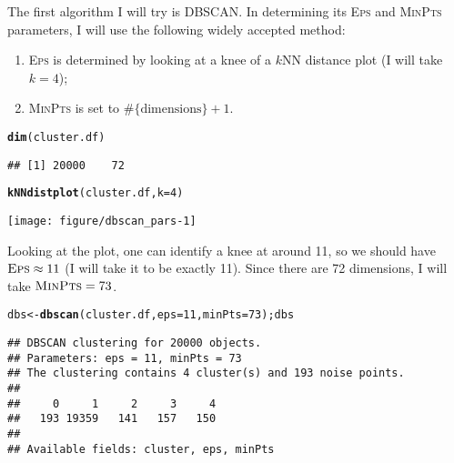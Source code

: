 \documentclass{article}\usepackage[]{graphicx}\usepackage[]{color}
\makeatletter
\def\maxwidth{ %
  \ifdim\Gin@nat@width>\linewidth
    \linewidth
  \else
    \Gin@nat@width
  \fi
}
\newcommand{\hlnum}[1]{\textcolor[rgb]{0.686,0.059,0.569}{#1}}%
\newcommand{\hlstd}[1]{\textcolor[rgb]{0.345,0.345,0.345}{#1}}%
\newcommand{\hlkwb}[1]{\textcolor[rgb]{0.69,0.353,0.396}{#1}}%
\newcommand{\hlkwc}[1]{\textcolor[rgb]{0.333,0.667,0.333}{#1}}%
\newcommand{\hlkwd}[1]{\textcolor[rgb]{0.737,0.353,0.396}{\textbf{#1}}}%
\newenvironment{kframe}{%
 \def\at@end@of@kframe{}%
 \ifinner\ifhmode%
  \def\at@end@of@kframe{\end{minipage}}%
  \begin{minipage}{\columnwidth}%
 \fi\fi%
 \def\FrameCommand##1{\hskip\@totalleftmargin \hskip-\fboxsep
 \colorbox{shadecolor}{##1}\hskip-\fboxsep
     \hskip-\linewidth \hskip-\@totalleftmargin \hskip\columnwidth}%
 \MakeFramed {\advance\hsize-\width
   \@totalleftmargin\z@ \linewidth\hsize
   \@setminipage}}%
 {\par\unskip\endMakeFramed%
 \at@end@of@kframe}
\newenvironment{knitrout}{}{} %
\makeatother
\begin{document}
The first algorithm I will try is DBSCAN.  In determining its \textsc{Eps} and
\textsc{MinPts} parameters, I will use the following widely accepted method:
\begin{enumerate}
\item \textsc{Eps} is determined by looking at a knee of a $k$NN distance plot
  (I will take $k = 4$);
\item \textsc{MinPts} is set to $\#\{\text{dimensions}\} + 1$.
\end{enumerate}

\begin{knitrout}
\color{fgcolor}\begin{kframe}
\begin{alltt}
\hlkwd{dim}\hlstd{(cluster.df)}
\end{alltt}
\begin{verbatim}
## [1] 20000    72
\end{verbatim}
\begin{alltt}
\hlkwd{kNNdistplot}\hlstd{(cluster.df,} \hlkwc{k}\hlstd{=}\hlnum{4}\hlstd{)}
\end{alltt}
\end{kframe}

{\centering \texttt{[image: figure/dbscan\_pars-1]} 

}



\end{knitrout}

Looking at the plot, one can identify a knee at around \num{11}, so we should
have $\textsc{Eps} \approx 11$ (I will take it to be exactly \num{11}).  Since
there are \num{72} dimensions, I will take $\textsc{MinPts} = 73$.

\begin{knitrout}
\color{fgcolor}\begin{kframe}
\begin{alltt}
\hlstd{dbs} \hlkwb{<-} \hlkwd{dbscan}\hlstd{(cluster.df,} \hlkwc{eps}\hlstd{=}\hlnum{11}\hlstd{,} \hlkwc{minPts}\hlstd{=}\hlnum{73}\hlstd{); dbs}
\end{alltt}
\begin{verbatim}
## DBSCAN clustering for 20000 objects.
## Parameters: eps = 11, minPts = 73
## The clustering contains 4 cluster(s) and 193 noise points.
## 
##     0     1     2     3     4 
##   193 19359   141   157   150 
## 
## Available fields: cluster, eps, minPts
\end{verbatim}
\end{kframe}
\end{knitrout}
\end{document}
